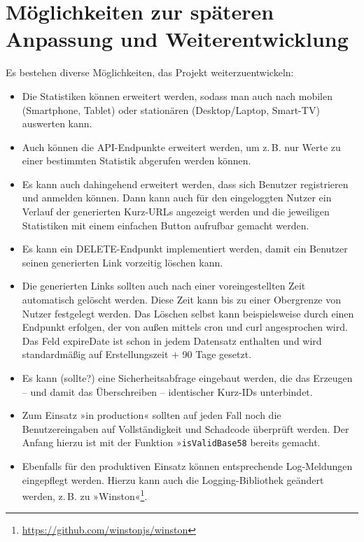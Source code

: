\documentclass[a4paper,11pt,DIV=12]{scrreprt}%
\begin{document}
\chapter{Möglichkeiten zur späteren Anpassung und Weiterentwicklung}
Es bestehen diverse Möglichkeiten, das Projekt weiterzuentwickeln:
\begin{itemize}
    \item Die Statistiken können erweitert werden, sodass man auch nach mobilen (Smartphone, Tablet) oder stationären (Desktop/Laptop, Smart-TV) auswerten kann.
    \item Auch können die \ac{API}-Endpunkte erweitert werden, um z.\,B. nur Werte zu einer bestimmten Statistik abgerufen werden können.
    \item Es kann auch dahingehend erweitert werden, dass sich Benutzer registrieren und anmelden können. Dann kann auch für den eingeloggten Nutzer ein Verlauf der generierten Kurz-\ac{URL}s angezeigt werden und die jeweiligen Statistiken mit einem einfachen Button aufrufbar gemacht werden.
    \item Es kann ein DELETE-Endpunkt implementiert werden, damit ein Benutzer seinen generierten Link vorzeitig löschen kann.
    \item Die generierten Links sollten auch nach einer voreingestellten Zeit automatisch gelöscht werden. Diese Zeit kann bis zu einer Obergrenze von Nutzer festgelegt werden. Das Löschen selbst kann beispielsweise durch einen Endpunkt erfolgen, der von außen mittels {\ttfamily cron} und {\ttfamily curl} angesprochen wird. Das Feld {\ttfamily expireDate} ist schon in jedem Datensatz enthalten und wird standardmäßig auf Erstellungszeit $+$ 90 Tage gesetzt.
    \item \label{sec:ErweiterungKollision}Es kann (sollte?) eine Sicherheitsabfrage eingebaut werden, die das Erzeugen – und damit das Überschreiben – identischer Kurz-IDs unterbindet.
    \item Zum Einsatz »in production« sollten auf jeden Fall noch die Benutzereingaben auf Vollständigkeit und Schadcode überprüft werden. Der Anfang hierzu ist mit der Funktion »\texttt{isValidBase58} bereits gemacht.
    \item Ebenfalls für den produktiven Einsatz können entsprechende Log-Meldungen eingepflegt werden. Hierzu kann auch die Logging-Bibliothek geändert werden, z.\,B. zu »Winston«\footnote{\href{https://github.com/winstonjs/winston}{https://github.com/winstonjs/winston}}.
\end{itemize}
    
\end{document}
